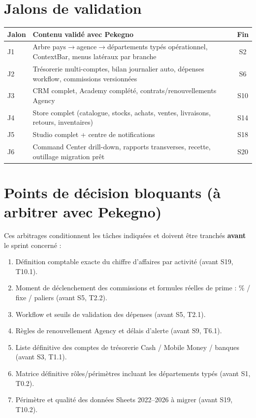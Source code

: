 \documentclass[11pt,a4paper]{article}
\begin{document}
\section{Jalons de validation}

\begin{tabularx}{\textwidth}{|l|Y|c|}
\hline
{}\textbf{Jalon} & \textbf{Contenu validé avec Pekegno} & \textbf{Fin} \\ \hline
J1 & Arbre pays$\rightarrow$agence$\rightarrow$départements typés opérationnel, ContextBar, menus latéraux par branche & S2 \\ \hline
J2 & Trésorerie multi-comptes, bilan journalier auto, dépenses workflow, commissions versionnées & S6 \\ \hline
J3 & CRM complet, Academy complété, contrats/renouvellements Agency & S10 \\ \hline
J4 & Store complet (catalogue, stocks, achats, ventes, livraisons, retours, inventaires) & S14 \\ \hline
J5 & Studio complet + centre de notifications & S18 \\ \hline
J6 & Command Center drill-down, rapports transverses, recette, outillage migration prêt & S20 \\ \hline
\end{tabularx}

\section{Points de décision bloquants (à arbitrer avec Pekegno)}

Ces arbitrages conditionnent les tâches indiquées et doivent être tranchés \textbf{avant} le sprint concerné :

\begin{enumerate}[nosep]
  \item Définition comptable exacte du chiffre d'affaires par activité (avant S19, T10.1).
  \item Moment de déclenchement des commissions et formules réelles de prime : \% / fixe / paliers (avant S5, T2.2).
  \item Workflow et seuils de validation des dépenses (avant S5, T2.1).
  \item Règles de renouvellement Agency et délais d'alerte (avant S9, T6.1).
  \item Liste définitive des comptes de trésorerie Cash / Mobile Money / banques (avant S3, T1.1).
  \item Matrice définitive rôles/périmètres incluant les départements typés (avant S1, T0.2).
  \item Périmètre et qualité des données Sheets 2022--2026 à migrer (avant S19, T10.2).
\end{enumerate}
\end{document}
